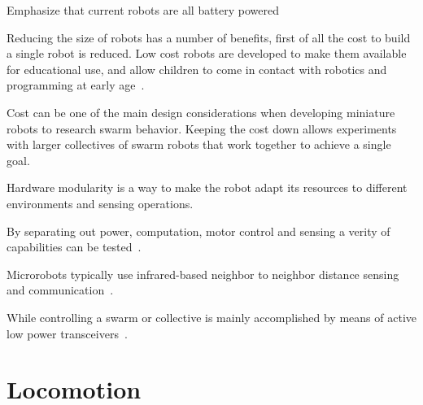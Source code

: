 
Emphasize that current robots are all battery powered

Reducing the size of robots has a number of benefits, first of all the cost to build a single robot is reduced.
Low cost robots are developed to make them available for educational use, and allow children to come in contact with robotics and programming at early age~\cite{rubenstein_icra_2015}.

Cost can be one of the main design considerations when developing miniature robots to research swarm behavior.
Keeping the cost down allows experiments with larger collectives of swarm robots that work together to achieve a single goal.


Hardware modularity is a way to make the robot adapt its resources to different environments and sensing operations.

By separating out power, computation, motor control and sensing a verity of capabilities can be tested~\cite{sabelhaus_icra_2013, pickem_icra_2015, kim_iros_2016}.

Microrobots typically use infrared-based neighbor to neighbor distance sensing and communication~\cite{rubenstein_icra_2012, pickem_icra_2015, kim_iros_2016}.

While controlling a swarm or collective is mainly accomplished by means of active low power transceivers~\cite{sabelhaus_icra_2013, pickem_icra_2015, kim_iros_2016}. 

\section{Locomotion}
\label{sec:locomotion}

